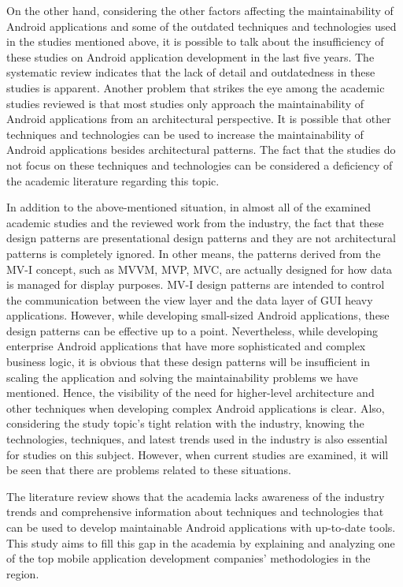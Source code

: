 On the other hand, considering the other factors affecting the maintainability of Android applications and some of the outdated techniques and technologies used in the studies mentioned above, it is possible to talk about the insufficiency of these studies on Android application development in the last five years. The systematic review indicates that the lack of detail and outdatedness in these studies is apparent. Another problem that strikes the eye among the academic studies reviewed is that most studies only approach the maintainability of Android applications from an architectural perspective. It is possible that other techniques and technologies can be used to increase the maintainability of Android applications besides architectural patterns. The fact that the studies do not focus on these techniques and technologies can be considered a deficiency of the academic literature regarding this topic.

In addition to the above-mentioned situation, in almost all of the examined academic studies and the reviewed work from the industry, the fact that these design patterns are presentational design patterns and they are not architectural patterns is completely ignored. In other means, the patterns derived from the MV-I concept, such as MVVM, MVP, MVC, are actually designed for how data is managed for display purposes. MV-I design patterns are intended to control the communication between the view layer and the data layer of GUI heavy applications. However, while developing small-sized Android applications, these design patterns can be effective up to a point. Nevertheless, while developing enterprise Android applications that have more sophisticated and complex business logic, it is obvious that these design patterns will be insufficient in scaling the application and solving the maintainability problems we have mentioned. Hence, the visibility of the need for higher-level architecture and other techniques when developing complex Android applications is clear.  Also, considering the study topic's tight relation with the industry, knowing the technologies, techniques, and latest trends used in the industry is also essential for studies on this subject. However, when current studies are examined, it will be seen that there are problems related to these situations.

The literature review shows that the academia lacks awareness of the industry trends and comprehensive information about techniques and technologies that can be used to develop maintainable Android applications with up-to-date tools. This study aims to fill this gap in the academia by explaining and analyzing one of the top mobile application development companies' methodologies in the region.